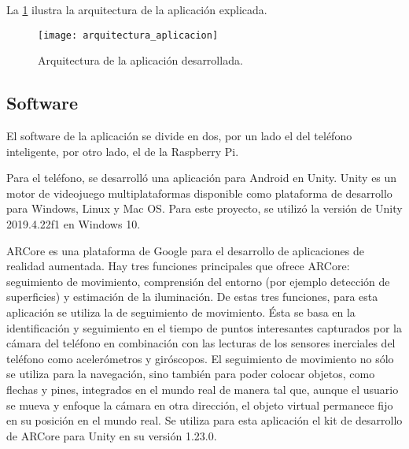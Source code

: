\documentclass{article}
\newenvironment{standalone}{\begin{preview}}{\end{preview}}
\begin{document}
\begin{standalone}
  La \cref{fig:arquitectura_aplicacion} ilustra la arquitectura de la aplicación explicada.

  \begin{figure}[ht!]
    \centering
    \texttt{[image: arquitectura\_aplicacion]}
    \caption{Arquitectura de la aplicación desarrollada.}
    \label{fig:arquitectura_aplicacion}
  \end{figure}


  \subsection{Software}

  El software de la aplicación se divide en dos, por un lado el del teléfono inteligente, por otro lado, el de la Raspberry Pi.

  Para el teléfono, se desarrolló una aplicación para Android en Unity.
  Unity es un motor de videojuego multiplataformas disponible como plataforma de desarrollo para Windows, Linux y Mac OS.
  Para este proyecto, se utilizó la versión de Unity 2019.4.22f1 en Windows 10.

  ARCore es una plataforma de Google para el desarrollo de aplicaciones de realidad aumentada.
  Hay tres funciones principales que ofrece ARCore: seguimiento de movimiento, comprensión del entorno (por ejemplo detección de superficies) y estimación de la iluminación.
  De estas tres funciones, para esta aplicación se utiliza la de seguimiento de movimiento.
  Ésta se basa en la identificación y seguimiento en el tiempo de puntos interesantes capturados por la cámara del teléfono en combinación con las lecturas de los sensores inerciales del teléfono como acelerómetros y giróscopos.
  El seguimiento de movimiento no sólo se utiliza para la navegación, sino también para poder colocar objetos, como flechas y pines, integrados en el mundo real de manera tal que, aunque el usuario se mueva y enfoque la cámara en otra dirección, el objeto virtual permanece fijo en su posición en el mundo real.
  Se utiliza para esta aplicación el kit de desarrollo de ARCore para Unity en su versión 1.23.0.


\end{standalone}
\end{document}
